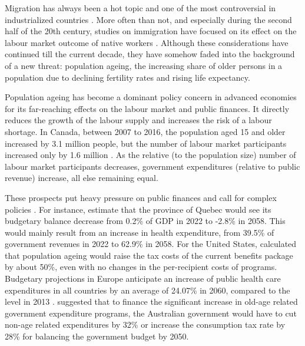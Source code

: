 Migration has always been a hot topic and one of the most controversial in industrialized countries \citep{Marois:2020je}.
More often than not, and especially during the second half of the 20th century, studies on immigration have focused on its effect on the labour market outcome of native workers \citep{Piche:2013ir,Fusaro:2018wi,Castles:2012vr}.
Although these considerations have continued till the current decade, they have somehow faded into the background of a new threat: population ageing, the increasing share of older persons in a population due to declining fertility rates and rising life expectancy.

\vspace{0.7em}\par
Population ageing has become a dominant policy concern in advanced economies for its far-reaching effects on the labour market and public finances.
It directly reduces the growth of the labour supply and increases the risk of a labour shortage.
In Canada, between 2007 to 2016, the population aged 15 and older increased by 3.1 million people, but the number of labour market participants increased only by 1.6 million \citep{Fields:2017wa}.
As the relative (to the population size) number of labour market participants decreases, government expenditures (relative to public revenue) increase, all else remaining equal.

\vspace{0.7em}\par
These prospects put heavy pressure on public finances and call for complex policies \citep{Godbout.2012,St-Maurice.2018uv,Lee:bKjc_XK_,Zokalj:2016bq,Kudrna:2015dr,Müller.2009}.
For instance, \citet{St-Maurice.2018uv} estimate that the province of Quebec would see its budgetary balance decrease from 0.2\% of GDP in 2022 to -2.8\% in 2058. This would mainly result from an increase in health expenditure, from 39.5\% of government revenues in 2022 to 62.9\% in 2058.
For the United States, \citet{Lee:bKjc_XK_} calculated that population ageing would raise the tax costs of the current benefits package by about 50\%, even with no changes in the per-recipient costs of programs.
Budgetary projections in Europe anticipate an increase of public health care expenditures in all countries by an average of 24.07\% in 2060, compared to the level in 2013 \citep{Zokalj:2016bq}.
\citet{Kudrna:2015dr} suggested that to finance the significant increase in old-age related government expenditure programs, the Australian government would have to cut non-age related expenditures by 32\% or increase the consumption tax rate by 28\% for balancing the government budget by 2050.

